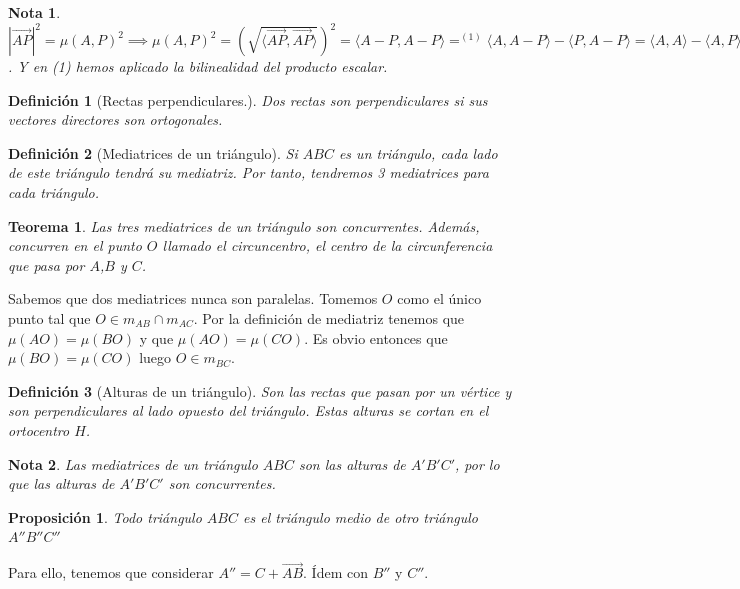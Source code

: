 \documentclass[11pt, a4paper]{article}
\makeatletter
\newif\IfInSansMode
\let\oldsf\sffamily
\renewcommand*{\sffamily}{\oldsf\mathversion{sans}\InSansModetrue}
\let\oldnorm\normalfont
\renewcommand*{\normalfont}{\oldnorm\InSansModefalse\mathversion{normal}}
\renewenvironment{proof}[1][\proofname] {\vspace{-15pt}\par\pushQED{\qed}\normalfont\topsep6\p@\@plus6\p@\relax\trivlist\item[\hskip\labelsep\it#1\@addpunct{.}]\ignorespaces}{\popQED\endtrivlist\@endpefalse}
\renewcommand{\vec}{\overrightarrow}
\renewenvironment{proof}[1][\proofname] {\par\pushQED{\qed}\normalfont\topsep6\p@\@plus6\p@\relax\trivlist\item[\hskip\labelsep\itshape\sffamily#1\@addpunct{.}]\ignorespaces}{\popQED\endtrivlist\@endpefalse}
\theoremstyle{theorem-style}
\newtheorem{nth}{Teorema}[section]
\newtheorem{nprop}{Proposición}[section]
\theoremstyle{definition-style}
\newtheorem{ndef}{Definición}[section]
\theoremstyle{remark-style}
\newtheorem*{nota}{Nota}
\theoremstyle{example-style}
\makeatother
\begin{document}
\begin{nota}
  $|\vec{AP}|^2 = \mu(A,P)^2\implies \mu(A,P)^2 = 	\left(\sqrt{\langle \vec{AP},\vec{AP}\rangle }\right)^2 =  \langle A-P, A-P \rangle  =^{(1)} \langle A,A-P\rangle -\langle P,A-P\rangle  =  \langle A,A\rangle  - \langle A,P\rangle +\langle P,P\rangle - \langle P,A\rangle   = |A|^2+|P|^2-2 \langle P,A\rangle $. Y en (1) hemos aplicado la bilinealidad del producto escalar.
\end{nota}
\begin{ndef}[Rectas perpendiculares.]
  Dos rectas son perpendiculares si sus vectores directores son ortogonales.
\end{ndef}

\begin{ndef}[Mediatrices de un triángulo]
  Si $ABC$ es un triángulo, cada lado de este triángulo tendrá su mediatriz. Por tanto, tendremos 3 mediatrices para cada triángulo.
\end{ndef}

\begin{nth}
  Las tres mediatrices de un triángulo son concurrentes. Además, concurren en el punto $O$ llamado el circuncentro, el centro de la circunferencia que pasa por $A$,$B$ y $C$.
\end{nth}
\begin{proof}
  Sabemos que dos mediatrices nunca son paralelas. Tomemos $O$ como el único punto tal que $O \in  m_{AB} \cap m_{AC}$. Por la definición de mediatriz tenemos que $\mu(AO) = \mu(BO)$ y que $\mu(AO) = \mu(CO)$. Es obvio entonces que $\mu(BO) = \mu(CO)$ luego $O \in m_{BC}$.
 
\end{proof}

\begin{ndef}[Alturas de un triángulo]
  Son las rectas que pasan por un vértice y son perpendiculares al lado opuesto del triángulo. Estas alturas se cortan en el ortocentro $H$.
\end{ndef}

\begin{nota}
  Las mediatrices de un triángulo $ABC$ son las alturas de $A'B'C'$, por lo que las alturas de $A'B'C'$ son concurrentes.
\end{nota}

\begin{nprop}
  Todo triángulo $ABC$ es el triángulo medio de otro triángulo $A''B''C''$
\end{nprop}
\begin{proof}
  Para ello, tenemos que considerar $A'' = C+ \vec{AB}$. Ídem con $B''$ y $C''$.
\end{proof}
\end{document}
